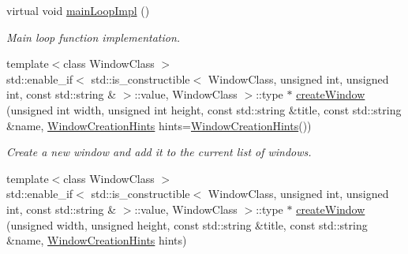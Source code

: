 \begin{DoxyCompactItemize}
virtual void \mbox{\hyperlink{classec_1_1_application_ad32692a6e65a00346ab2992eba3a86e7}{main\+Loop\+Impl}} ()
\begin{DoxyCompactList}\small\item\em Main loop function implementation. \end{DoxyCompactList}\item 
{\footnotesize template$<$class Window\+Class $>$ }\\std\+::enable\+\_\+if$<$ std\+::is\+\_\+constructible$<$ Window\+Class, unsigned int, unsigned int, const std\+::string \& $>$\+::value, Window\+Class $>$\+::type $\ast$ \mbox{\hyperlink{classec_1_1_application_af103b97a3296f63ec0597756628e26f9}{create\+Window}} (unsigned int width, unsigned int height, const std\+::string \&title, const std\+::string \&name, \mbox{\hyperlink{structec_1_1_window_creation_hints}{Window\+Creation\+Hints}} hints=\mbox{\hyperlink{structec_1_1_window_creation_hints}{Window\+Creation\+Hints}}())
\begin{DoxyCompactList}\small\item\em Create a new window and add it to the current list of windows. \end{DoxyCompactList}\item 
{\footnotesize template$<$class Window\+Class $>$ }\\std\+::enable\+\_\+if$<$ std\+::is\+\_\+constructible$<$ Window\+Class, unsigned int, unsigned int, const std\+::string \& $>$\+::value, Window\+Class $>$\+::type $\ast$ \mbox{\hyperlink{classec_1_1_application_a85fa865bee513c973b317edc1ac6ec35}{create\+Window}} (unsigned width, unsigned height, const std\+::string \&title, const std\+::string \&name, \mbox{\hyperlink{structec_1_1_window_creation_hints}{Window\+Creation\+Hints}} hints)
\end{DoxyCompactItemize}

